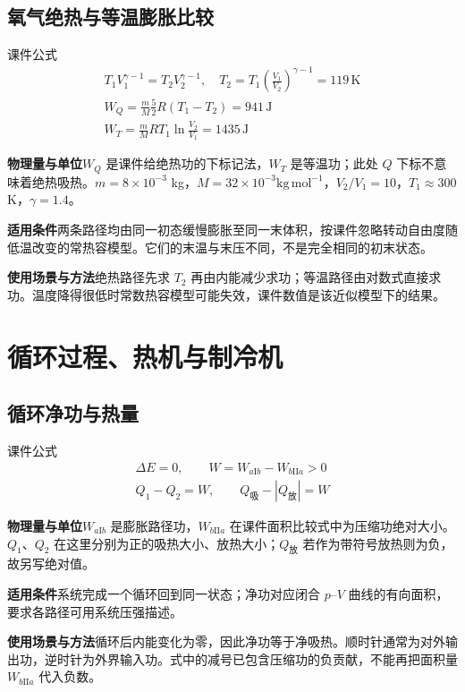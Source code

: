 \documentclass[UTF8,fontset=none,zihao=-4,a4paper]{ctexart}
\newcommand{\chapterpage}[1]{\clearpage\section{#1}}
\newcommand{\unit}[1]{\,\mathrm{#1}}
\newcommand{\explain}[3]{\par\noindent\textbf{物理量与单位}\quad #1\par
\noindent\textbf{适用条件}\quad #2\par
\noindent\textbf{使用场景与方法}\quad #3\par}
\begin{document}
\par\noindent\begin{minipage}{\linewidth}
\subsection{氧气绝热与等温膨胀比较}
\begin{infobox}[breakable=false]{课件公式}
\begin{gather*}T_1V_1^{\gamma-1}=T_2V_2^{\gamma-1},\quad T_2=T_1\left(\frac{V_1}{V_2}\right)^{\gamma-1}=119\unit K\\W_Q=\frac mM\frac52R(T_1-T_2)=941\unit J\\W_T=\frac mM RT_1\ln\frac{V_2}{V_1}=1435\unit J\end{gather*}
\end{infobox}
\end{minipage}\par
\explain{$W_Q$ 是课件给绝热功的下标记法，$W_T$ 是等温功；此处 $Q$ 下标不意味着绝热吸热。$m=8\times10^{-3}$ kg，$M=32\times10^{-3}\mathrm{kg\,mol^{-1}}$，$V_2/V_1=10$，$T_1\approx300$ K，$\gamma=1.4$。}{两条路径均由同一初态缓慢膨胀至同一末体积，按课件忽略转动自由度随低温改变的常热容模型。它们的末温与末压不同，不是完全相同的初末状态。}{绝热路径先求 $T_2$ 再由内能减少求功；等温路径由对数式直接求功。温度降得很低时常数热容模型可能失效，课件数值是该近似模型下的结果。}


\chapterpage{循环过程、热机与制冷机}
\par\noindent\begin{minipage}{\linewidth}
\subsection{循环净功与热量}
\begin{infobox}[breakable=false]{课件公式}
\begin{gather*}\Delta E=0,\qquad W=W_{a\mathrm I b}-W_{b\mathrm{II}a}>0\\Q_1-Q_2=W,\qquad Q_{\text{吸}}-|Q_{\text{放}}|=W\end{gather*}
\end{infobox}
\end{minipage}\par
\explain{$W_{a\mathrm I b}$ 是膨胀路径功，$W_{b\mathrm{II}a}$ 在课件面积比较式中为压缩功绝对大小。$Q_1$、$Q_2$ 在这里分别为正的吸热大小、放热大小；$Q_{\text{放}}$ 若作为带符号放热则为负，故另写绝对值。}{系统完成一个循环回到同一状态；净功对应闭合 $p$--$V$ 曲线的有向面积，要求各路径可用系统压强描述。}{循环后内能变化为零，因此净功等于净吸热。顺时针通常为对外输出功，逆时针为外界输入功。式中的减号已包含压缩功的负贡献，不能再把面积量 $W_{b\mathrm{II}a}$ 代入负数。}
\end{document}

